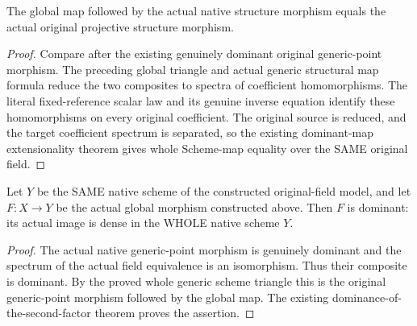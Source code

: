 \begin{theorem}
\label{thm:seven-original-native-global-base-route}
\leanok
{}
The global map followed by the actual native structure morphism equals the
actual original projective structure morphism.
\end{theorem}
\begin{proof}
Compare after the existing genuinely dominant original generic-point
morphism. The preceding global triangle and actual generic structural map
formula reduce the two composites to spectra of coefficient homomorphisms.
The literal fixed-reference scalar law and its genuine inverse equation
identify these homomorphisms on every original coefficient. The original
source is reduced, and the target coefficient spectrum is separated, so
the existing dominant-map extensionality theorem gives whole Scheme-map
equality over the SAME original field.
\end{proof}

\begin{theorem}
\label{thm:seven-original-native-global-dominant-route}
\leanok
{}
Let $Y$ be the SAME native scheme of the constructed original-field model,
and let $F:X\to Y$ be the actual global morphism constructed above. Then
$F$ is dominant: its actual image is dense in the WHOLE native scheme $Y$.
\end{theorem}
\begin{proof}
The actual native generic-point morphism is genuinely dominant and the
spectrum of the actual field equivalence is an isomorphism. Thus their
composite is dominant. By the proved whole generic scheme triangle this
is the original generic-point morphism followed by the global map.
The existing dominance-of-the-second-factor theorem proves the assertion.
\end{proof}

